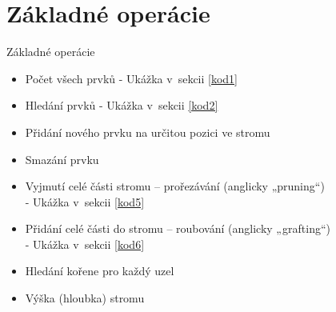\documentclass[10pt, hyperref={unicode}]{beamer}
\begin{document}
\section{Základné operácie}
\begin{frame}{Základné operácie}
            \begin{itemize}
				\item Počet všech prvků - Ukážka v~sekcii \ref{kod1}
				\item Hledání prvků - Ukážka v~sekcii \ref{kod2}
				\item Přidání nového prvku na určitou pozici ve stromu
				\item Smazání prvku
				\item Vyjmutí celé části stromu – prořezávání (anglicky „pruning“)\\ - 
				Ukážka v~sekcii \ref{kod5}
				\item Přidání celé části do stromu – roubování (anglicky „grafting“)\\ - 
				Ukážka v~sekcii \ref{kod6}
				\item Hledání kořene pro každý uzel
				\item Výška (hloubka) stromu
			\end{itemize}
\end{frame}
\end{document}
